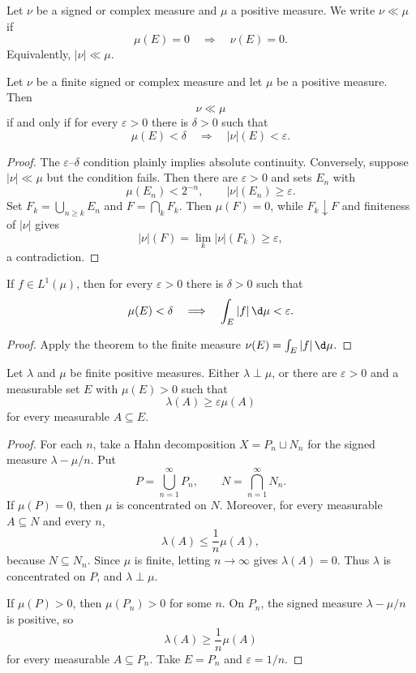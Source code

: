 \begin{de}
Let $\nu$ be a signed or complex measure and $\mu$ a positive measure. We write $\nu\ll\mu$ if
\[
\mu(E)=0\quad\Longrightarrow\quad\nu(E)=0.
\]
Equivalently, $|\nu|\ll\mu$.
\end{de}

\begin{thm}
Let $\nu$ be a finite signed or complex measure and let $\mu$ be a positive measure. Then
\[
\nu\ll\mu
\]
if and only if for every $\varepsilon>0$ there is $\delta>0$ such that
\[
\mu(E)<\delta\quad\Longrightarrow\quad |\nu|(E)<\varepsilon.
\]
\end{thm}

\begin{proof}
The $\varepsilon$--$\delta$ condition plainly implies absolute continuity. Conversely, suppose $|\nu|\ll\mu$ but the condition fails. Then there are $\varepsilon>0$ and sets $E_n$ with
\[
\mu(E_n)<2^{-n},
\qquad |\nu|(E_n)\geq\varepsilon.
\]
Set $F_k=\bigcup_{n\geq k}E_n$ and $F=\bigcap_kF_k$. Then $\mu(F)=0$, while $F_k\downarrow F$ and finiteness of $|\nu|$ gives
\[
|\nu|(F)=\lim_k|\nu|(F_k)\geq\varepsilon,
\]
a contradiction.
\end{proof}

\begin{cor}
If $f\in L^1(\mu)$, then for every $\varepsilon>0$ there is $\delta>0$ such that
\[
\mu(E)<\delta\quad\Longrightarrow\quad\int_E|f|\,\d\mu<\varepsilon.
\]
\end{cor}

\begin{proof}
Apply the theorem to the finite measure $\nu(E)=\int_E|f|\,\d\mu$.
\end{proof}

\begin{lem}
Let $\lambda$ and $\mu$ be finite positive measures. Either $\lambda\perp\mu$, or there are $\varepsilon>0$ and a measurable set $E$ with $\mu(E)>0$ such that
\[
\lambda(A)\geq\varepsilon\mu(A)
\]
for every measurable $A\subseteq E$.
\end{lem}

\begin{proof}
For each $n$, take a Hahn decomposition $X=P_n\sqcup N_n$ for the signed measure $\lambda-\mu/n$. Put
\[
P=\bigcup_{n=1}^{\infty}P_n,
\qquad N=\bigcap_{n=1}^{\infty}N_n.
\]
If $\mu(P)=0$, then $\mu$ is concentrated on $N$. Moreover, for every measurable $A\subseteq N$ and every $n$,
\[
\lambda(A)\leq\frac1n\mu(A),
\]
because $N\subseteq N_n$. Since $\mu$ is finite, letting $n\to\infty$ gives $\lambda(A)=0$. Thus $\lambda$ is concentrated on $P$, and $\lambda\perp\mu$.

If $\mu(P)>0$, then $\mu(P_n)>0$ for some $n$. On $P_n$, the signed measure $\lambda-\mu/n$ is positive, so
\[
\lambda(A)\geq\frac1n\mu(A)
\]
for every measurable $A\subseteq P_n$. Take $E=P_n$ and $\varepsilon=1/n$.
\end{proof}

